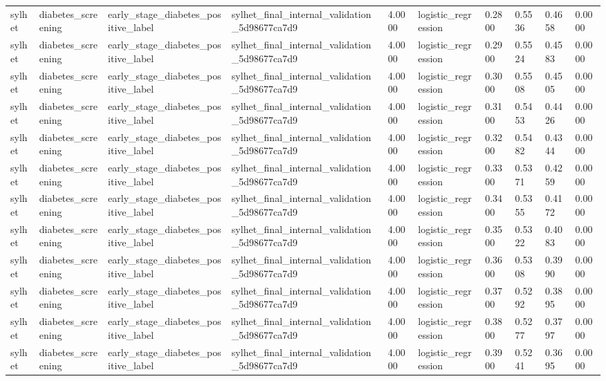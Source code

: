 \begin{tabular}{llllllllll}
sylhet & diabetes\_screening & early\_stage\_diabetes\_positive\_label & sylhet\_final\_internal\_validation\_5d98677ca7d9 & 4.0000 & logistic\_regression & 0.2800 & 0.5536 & 0.4658 & 0.0000 \\
sylhet & diabetes\_screening & early\_stage\_diabetes\_positive\_label & sylhet\_final\_internal\_validation\_5d98677ca7d9 & 4.0000 & logistic\_regression & 0.2900 & 0.5524 & 0.4583 & 0.0000 \\
sylhet & diabetes\_screening & early\_stage\_diabetes\_positive\_label & sylhet\_final\_internal\_validation\_5d98677ca7d9 & 4.0000 & logistic\_regression & 0.3000 & 0.5508 & 0.4505 & 0.0000 \\
sylhet & diabetes\_screening & early\_stage\_diabetes\_positive\_label & sylhet\_final\_internal\_validation\_5d98677ca7d9 & 4.0000 & logistic\_regression & 0.3100 & 0.5453 & 0.4426 & 0.0000 \\
sylhet & diabetes\_screening & early\_stage\_diabetes\_positive\_label & sylhet\_final\_internal\_validation\_5d98677ca7d9 & 4.0000 & logistic\_regression & 0.3200 & 0.5482 & 0.4344 & 0.0000 \\
sylhet & diabetes\_screening & early\_stage\_diabetes\_positive\_label & sylhet\_final\_internal\_validation\_5d98677ca7d9 & 4.0000 & logistic\_regression & 0.3300 & 0.5371 & 0.4259 & 0.0000 \\
sylhet & diabetes\_screening & early\_stage\_diabetes\_positive\_label & sylhet\_final\_internal\_validation\_5d98677ca7d9 & 4.0000 & logistic\_regression & 0.3400 & 0.5355 & 0.4172 & 0.0000 \\
sylhet & diabetes\_screening & early\_stage\_diabetes\_positive\_label & sylhet\_final\_internal\_validation\_5d98677ca7d9 & 4.0000 & logistic\_regression & 0.3500 & 0.5322 & 0.4083 & 0.0000 \\
sylhet & diabetes\_screening & early\_stage\_diabetes\_positive\_label & sylhet\_final\_internal\_validation\_5d98677ca7d9 & 4.0000 & logistic\_regression & 0.3600 & 0.5308 & 0.3990 & 0.0000 \\
sylhet & diabetes\_screening & early\_stage\_diabetes\_positive\_label & sylhet\_final\_internal\_validation\_5d98677ca7d9 & 4.0000 & logistic\_regression & 0.3700 & 0.5292 & 0.3895 & 0.0000 \\
sylhet & diabetes\_screening & early\_stage\_diabetes\_positive\_label & sylhet\_final\_internal\_validation\_5d98677ca7d9 & 4.0000 & logistic\_regression & 0.3800 & 0.5277 & 0.3797 & 0.0000 \\
sylhet & diabetes\_screening & early\_stage\_diabetes\_positive\_label & sylhet\_final\_internal\_validation\_5d98677ca7d9 & 4.0000 & logistic\_regression & 0.3900 & 0.5241 & 0.3695 & 0.0000 \\

\end{tabular}
